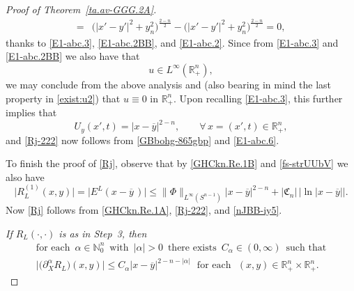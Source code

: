 \documentclass[11pt,reqno]{amsart}
\numberwithin{equation}{section}
\theoremstyle{remark}
\begin{document}
\begin{proof}[Proof of Theorem~\ref{ta.av-GGG.2A}]
\begin{align}
=& \big(|x'-y'|^2+y_n^2\big)^{\frac{2-n}{2}}-\big(|x'-y'|^2+y_n^2\big)^{\frac{2-n}{2}}=0,
\end{align}
%
thanks to \eqref{E1-abc.3}, \eqref{E1-abc.2BB}, and \eqref{E1-abc.2}. 
Since from \eqref{E1-abc.3} and \eqref{E1-abc.2BB} we also have that 
%
\begin{equation}\label{E1-abc.5}
u\in L^\infty({\mathbb{R}}^n_{+}),
\end{equation}
%
we may conclude from the above analysis and \cite[Proposition~1, p.\,199]{St70} 
(also bearing in mind the last property in \eqref{exist:u2}) that $u\equiv 0$ in ${\mathbb{R}}^n_{+}$. 
Upon recalling \eqref{E1-abc.3}, this further implies that
%
\begin{equation}\label{E1-abc.6}
U_y(x',t)=|x-\overline{y}|^{2-n},\qquad\forall\,x=(x',t)\in{\mathbb{R}}^n_{+},
\end{equation}
%
and \eqref{Rj-222} now follows from \eqref{GBbohg-865gbp} and \eqref{E1-abc.6}.

To finish the proof of \eqref{Rj}, observe that by \eqref{GHCkn.Re.1B} 
and \eqref{fs-strUUbV} we also have 
%
\begin{equation}\label{nJBB-iy5}
\big|R^{(1)}_L(x,y)\big|=
\big|E^L(x-\overline{y}\,)\big|\leq\|\Phi\|_{L^\infty(S^{n-1})}
|x-{\overline{y}}|^{2-n}+\big|{\mathfrak{C}}_n\big|\,\big|\!\ln|x-\overline{y}|\big|.
\end{equation}
%
Now \eqref{Rj} follows from \eqref{GHCkn.Re.1A}, \eqref{Rj-222}, and \eqref{nJBB-iy5}. 


\vskip 0.08in
 \textit{If $R_L(\cdot,\cdot)$ is as in Step~3, then 
%
\begin{equation}\label{Pavr-6T4}
\begin{array}{c}
\text{for each }\,\alpha\in\mathbb{N}_0^n\,\text{ with }\,
|\alpha|>0\,\text{ there exists }\,C_{\alpha}\in(0,\infty)\,\text{ such that}
\\[4pt]
\big|\big(\partial^\alpha_X R_L\big)(x,y)\big|
\leq C_\alpha|x-\overline{y}|^{2-n-|\alpha|}\,\,\text{ for each }\,\,
(x,y)\in{\mathbb{R}}^n_{+}\times{\mathbb{R}}^n_{+}.
\end{array}
\end{equation}
}
\vskip -0.05in


\end{proof}
\end{document}
